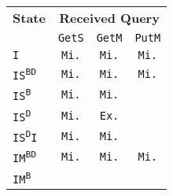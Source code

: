 \begin{tabular}{|l||c|c|c|}
 \hline

 \textbf{State}
 & \multicolumn{3}{c|}{\textbf{Received Query}}
 \\

 & \texttt{GetS} & \texttt{GetM} & \texttt{PutM}
 \\
 \hline

 \texttt{I}

 & \cellcolor{olive!80}\texttt{Mi.}
 & \cellcolor{olive!80}\texttt{Mi.}
 & \cellcolor{olive!80}\texttt{Mi.}
 \\
 \hline

 \texttt{IS\textsuperscript{BD}}

 & \cellcolor{olive!80}\texttt{Mi.}
 & \cellcolor{olive!80}\texttt{Mi.}
 & \cellcolor{olive!80}\texttt{Mi.}
 \\
 \hline

 \texttt{IS\textsuperscript{B}}

 & \cellcolor{olive!80}\texttt{Mi.}
 & \cellcolor{olive!80}\texttt{Mi.}
 & \cellcolor{black!40}
 \\
 \hline

 \texttt{IS\textsuperscript{D}}

 & \cellcolor{olive!80}\texttt{Mi.}
 & \cellcolor{orange!60}\texttt{Ex.}
 & \cellcolor{black!40}
 \\
 \hline

 \texttt{IS\textsuperscript{D}I}

 & \cellcolor{olive!80}\texttt{Mi.}
 & \cellcolor{olive!80}\texttt{Mi.}
 & \cellcolor{black!40}
 \\
 \hline

 \texttt{IM\textsuperscript{BD}}

 & \cellcolor{olive!80}\texttt{Mi.}
 & \cellcolor{olive!80}\texttt{Mi.}
 & \cellcolor{olive!80}\texttt{Mi.}
 \\
 \hline

 \texttt{IM\textsuperscript{B}}


\end{tabular}

